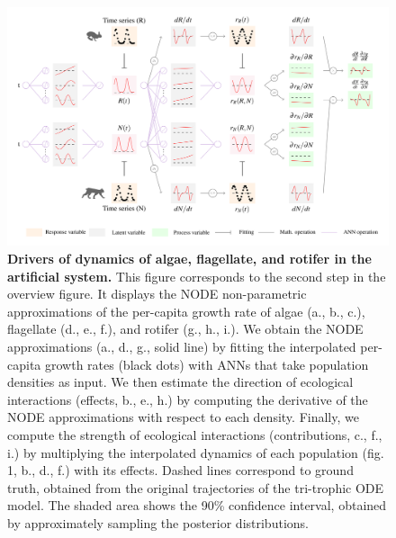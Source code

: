 \documentclass[11pt, oneside]{article}
\begin{document}
\newpage
\begin{figure}[H]
\begin{center}
\includegraphics[width=\linewidth,page=3]{figures/main.pdf}
\caption{
    \textbf{Drivers of dynamics of algae, flagellate, and rotifer in the artificial system.}
    This figure corresponds to the second step in the overview figure.
    It displays the NODE non-parametric approximations of the per-capita growth rate of algae (a., b., c.), flagellate (d., e., f.), and rotifer (g., h., i.).
    We obtain the NODE approximations (a., d., g., solid line) by fitting the interpolated per-capita growth rates (black dots) with ANNs that take population densities as input.
    We then estimate the direction of ecological interactions (effects, b., e., h.) by computing the derivative of the NODE approximations with respect to each density.
    Finally, we compute the strength of ecological interactions (contributions, c., f., i.) by multiplying the interpolated dynamics of each population (fig. 1, b., d., f.) with its effects.
    Dashed lines correspond to ground truth, obtained from the original trajectories of the tri-trophic ODE model. 
    The shaded area shows the 90\% confidence interval, obtained by approximately sampling the posterior distributions. 
}
\end{center}
\end{figure}
\newpage
\end{document}
